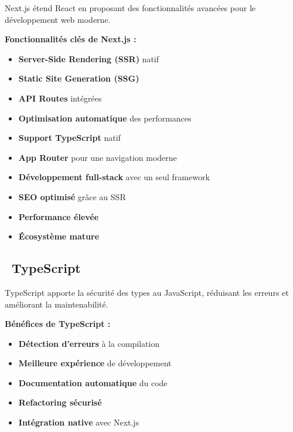 Next.js étend React en proposant des fonctionnalités avancées pour le développement web moderne.

\textbf{\color{primaryblue}Fonctionnalités clés de Next.js :}
\begin{itemize}
    \item \textcolor{primaryblue}{\textbf{Server-Side Rendering (SSR)}} natif
    \item \textcolor{primaryblue}{\textbf{Static Site Generation (SSG)}}
    \item \textcolor{primaryblue}{\textbf{API Routes}} intégrées
    \item \textcolor{primaryblue}{\textbf{Optimisation automatique}} des performances
    \item \textcolor{primaryblue}{\textbf{Support TypeScript}} natif
    \item \textcolor{primaryblue}{\textbf{App Router}} pour une navigation moderne
\end{itemize}

\begin{warningbox}
\begin{itemize}
    \item \textcolor{accentgreen}{\textbf{Développement full-stack}} avec un seul framework
    \item \textcolor{accentgreen}{\textbf{SEO optimisé}} grâce au SSR
    \item \textcolor{accentgreen}{\textbf{Performance élevée}}
    \item \textcolor{accentgreen}{\textbf{Écosystème mature}}
\end{itemize}
\end{warningbox}

\subsection{\faCode\ TypeScript}

TypeScript apporte la sécurité des types au JavaScript, réduisant les erreurs et améliorant la maintenabilité.

\textbf{\color{primaryblue}Bénéfices de TypeScript :}
\begin{itemize}
    \item \textcolor{accentgreen}{\textbf{Détection d'erreurs}} à la compilation
    \item \textcolor{accentgreen}{\textbf{Meilleure expérience}} de développement
    \item \textcolor{accentgreen}{\textbf{Documentation automatique}} du code
    \item \textcolor{accentgreen}{\textbf{Refactoring sécurisé}}
    \item \textcolor{accentgreen}{\textbf{Intégration native}} avec Next.js
\end{itemize}


